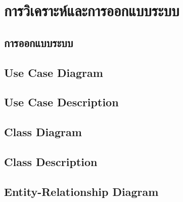 \baselineskip=8mm
\chapter{การวิเคราะห์และการออกแบบระบบ}

\renewcommand{\thesubsection}{\arabic{subsection}.}
\renewcommand{\theequation}{\thesection.\arabic{equation}}
\renewcommand{\thesection}{}


\section{การออกแบบระบบ}

\section{Use Case Diagram}

\section{Use Case Description}

\section{Class Diagram}

\section{Class Description}

\section{Entity-Relationship Diagram}

